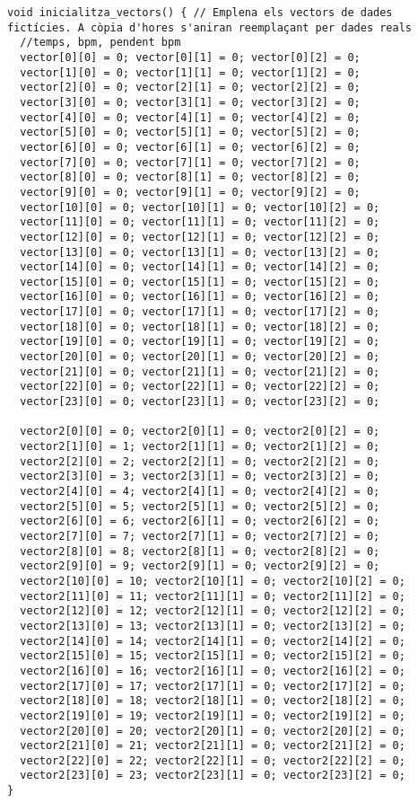 \begin{lstlisting}[style=myArduino]
void inicialitza_vectors() { // Emplena els vectors de dades fictícies. A còpia d'hores s'aniran reemplaçant per dades reals
  //temps, bpm, pendent bpm
  vector[0][0] = 0; vector[0][1] = 0; vector[0][2] = 0;
  vector[1][0] = 0; vector[1][1] = 0; vector[1][2] = 0;
  vector[2][0] = 0; vector[2][1] = 0; vector[2][2] = 0;
  vector[3][0] = 0; vector[3][1] = 0; vector[3][2] = 0;
  vector[4][0] = 0; vector[4][1] = 0; vector[4][2] = 0;
  vector[5][0] = 0; vector[5][1] = 0; vector[5][2] = 0;
  vector[6][0] = 0; vector[6][1] = 0; vector[6][2] = 0;
  vector[7][0] = 0; vector[7][1] = 0; vector[7][2] = 0;
  vector[8][0] = 0; vector[8][1] = 0; vector[8][2] = 0;
  vector[9][0] = 0; vector[9][1] = 0; vector[9][2] = 0;
  vector[10][0] = 0; vector[10][1] = 0; vector[10][2] = 0;
  vector[11][0] = 0; vector[11][1] = 0; vector[11][2] = 0;
  vector[12][0] = 0; vector[12][1] = 0; vector[12][2] = 0;
  vector[13][0] = 0; vector[13][1] = 0; vector[13][2] = 0;
  vector[14][0] = 0; vector[14][1] = 0; vector[14][2] = 0;
  vector[15][0] = 0; vector[15][1] = 0; vector[15][2] = 0;
  vector[16][0] = 0; vector[16][1] = 0; vector[16][2] = 0;
  vector[17][0] = 0; vector[17][1] = 0; vector[17][2] = 0;
  vector[18][0] = 0; vector[18][1] = 0; vector[18][2] = 0;
  vector[19][0] = 0; vector[19][1] = 0; vector[19][2] = 0;
  vector[20][0] = 0; vector[20][1] = 0; vector[20][2] = 0;
  vector[21][0] = 0; vector[21][1] = 0; vector[21][2] = 0;
  vector[22][0] = 0; vector[22][1] = 0; vector[22][2] = 0;
  vector[23][0] = 0; vector[23][1] = 0; vector[23][2] = 0;

  vector2[0][0] = 0; vector2[0][1] = 0; vector2[0][2] = 0;
  vector2[1][0] = 1; vector2[1][1] = 0; vector2[1][2] = 0;
  vector2[2][0] = 2; vector2[2][1] = 0; vector2[2][2] = 0;
  vector2[3][0] = 3; vector2[3][1] = 0; vector2[3][2] = 0;
  vector2[4][0] = 4; vector2[4][1] = 0; vector2[4][2] = 0;
  vector2[5][0] = 5; vector2[5][1] = 0; vector2[5][2] = 0;
  vector2[6][0] = 6; vector2[6][1] = 0; vector2[6][2] = 0;
  vector2[7][0] = 7; vector2[7][1] = 0; vector2[7][2] = 0;
  vector2[8][0] = 8; vector2[8][1] = 0; vector2[8][2] = 0;
  vector2[9][0] = 9; vector2[9][1] = 0; vector2[9][2] = 0;
  vector2[10][0] = 10; vector2[10][1] = 0; vector2[10][2] = 0;
  vector2[11][0] = 11; vector2[11][1] = 0; vector2[11][2] = 0;
  vector2[12][0] = 12; vector2[12][1] = 0; vector2[12][2] = 0;
  vector2[13][0] = 13; vector2[13][1] = 0; vector2[13][2] = 0;
  vector2[14][0] = 14; vector2[14][1] = 0; vector2[14][2] = 0;
  vector2[15][0] = 15; vector2[15][1] = 0; vector2[15][2] = 0;
  vector2[16][0] = 16; vector2[16][1] = 0; vector2[16][2] = 0;
  vector2[17][0] = 17; vector2[17][1] = 0; vector2[17][2] = 0;
  vector2[18][0] = 18; vector2[18][1] = 0; vector2[18][2] = 0;
  vector2[19][0] = 19; vector2[19][1] = 0; vector2[19][2] = 0;
  vector2[20][0] = 20; vector2[20][1] = 0; vector2[20][2] = 0;
  vector2[21][0] = 21; vector2[21][1] = 0; vector2[21][2] = 0;
  vector2[22][0] = 22; vector2[22][1] = 0; vector2[22][2] = 0;
  vector2[23][0] = 23; vector2[23][1] = 0; vector2[23][2] = 0;
}


\end{lstlisting}
